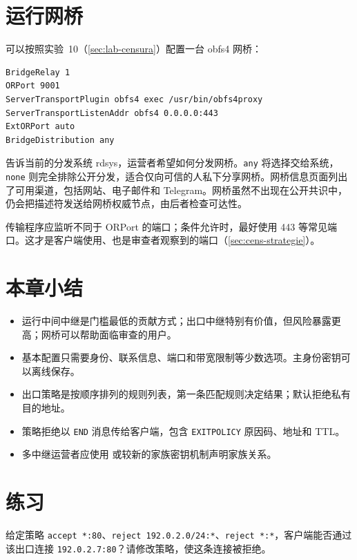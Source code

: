 \section{运行网桥}\label{sec:relay-bridge}

可以按照实验~10（\cref{sec:lab-censura}）配置一台 obfs4 网桥：
\begin{lstlisting}[numbers=none]
BridgeRelay 1
ORPort 9001
ServerTransportPlugin obfs4 exec /usr/bin/obfs4proxy
ServerTransportListenAddr obfs4 0.0.0.0:443
ExtORPort auto
BridgeDistribution any
\end{lstlisting}
 告诉当前的分发系统 rdsys，运营者希望如何分发网桥。\texttt{any} 将选择交给系统，\texttt{none} 则完全排除公开分发，适合仅向可信的人私下分享网桥。网桥信息页面列出了可用渠道，包括网站、电子邮件和 Telegram。网桥虽然不出现在公开共识中，仍会把描述符发送给网桥权威节点，由后者检查可达性。

传输程序应监听不同于 ORPort 的端口；条件允许时，最好使用 443 等常见端口。这才是客户端使用、也是审查者观察到的端口（\cref{sec:cens-strategie}）。

\section*{本章小结}
\begin{itemize}
  \item 运行中间中继是门槛最低的贡献方式；出口中继特别有价值，但风险暴露更高；网桥可以帮助面临审查的用户。
  \item 基本配置只需要身份、联系信息、端口和带宽限制等少数选项。主身份密钥可以离线保存。
  \item 出口策略是按顺序排列的规则列表，第一条匹配规则决定结果；默认拒绝私有目的地址。
  \item 策略拒绝以 \texttt{END} 消息传给客户端，包含 \texttt{EXITPOLICY} 原因码、地址和 TTL。
  \item 多中继运营者应使用  或较新的家族密钥机制声明家族关系。
\end{itemize}

\section*{练习}

\begin{esercizio}[1]\label{es:22-ordine}
给定策略 \texttt{accept *:80}、\texttt{reject 192.0.2.0/24:*}、\texttt{reject *:*}，客户端能否通过该出口连接 \texttt{192.0.2.7:80}？请修改策略，使这条连接被拒绝。
\end{esercizio}

